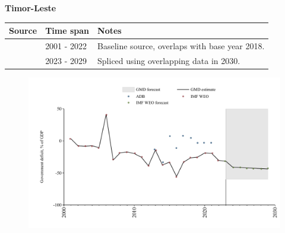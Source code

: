 \documentclass[12pt,a4paper,landscape]{article}
\begin{document}
\begin{adjustbox}{max totalsize={\paperwidth}{\paperheight},center}
\begin{minipage}[t][\textheight][t]{\textwidth}
\vspace*{0.5cm}
{}
\begin{center}
{\Large\bfseries Timor-Leste}
\end{center}
\vspace{0.5cm}
\begin{table}[H]
\centering
\small
\begin{tabular}{|l|l|l|}
\hline
\textbf{Source} & \textbf{Time span} & \textbf{Notes} \\
\hline
\rowcolor{white}\cite{IMF_WEO}& 2001 - 2022 &Baseline source, overlaps with base year 2018.\\
\rowcolor{lightgray}\cite{IMF_WEO_forecast}& 2023 - 2029 &Spliced using overlapping data in 2030.\\
\hline
\end{tabular}
\end{table}
\begin{figure}[H]
\centering
\includegraphics[width=\textwidth,height=0.6\textheight,keepaspectratio]{graphs/TLS_govdef_GDP.pdf}
\end{figure}
\end{minipage}
\end{adjustbox}
\end{document}
